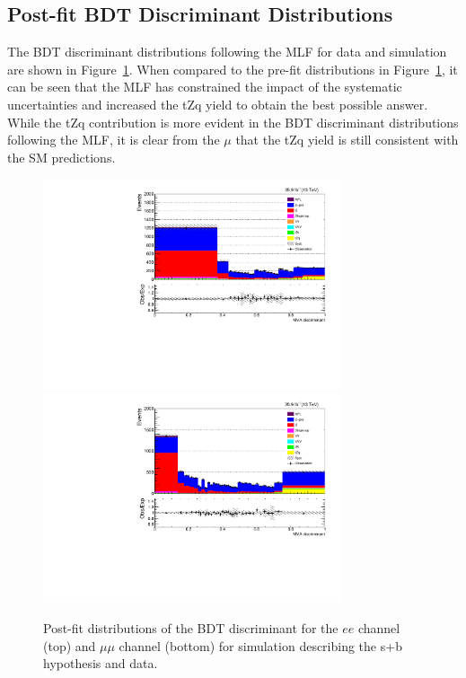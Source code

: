 \subsection{Post-fit BDT Discriminant Distributions}
The BDT discriminant distributions following the MLF for data and simulation are shown in Figure~\ref{fig:postfitBDT}.
When compared to the pre-fit distributions in Figure~\ref{fig:postfitBDT}, it can be seen that the MLF has constrained the impact of the systematic uncertainties and increased the tZq yield to obtain the best possible answer.
While the tZq contribution is more evident in the BDT discriminant distributions following the MLF, it is clear from the $\mu$ that the tZq yield is still consistent with the SM predictions.

\begin{figure}[!h]
\centering
\includegraphics[width=0.78\textwidth]{figs/results/postfit_ee.pdf}
\\
\includegraphics[width=0.78\textwidth]{figs/results/postfit_mumu.pdf}
\caption{
Post-fit distributions of the BDT discriminant for the $ee$ channel (top) and $\mu\mu$ channel (bottom) for simulation describing the s+b hypothesis and data.}
\label{fig:postfitBDT}
\end{figure}

